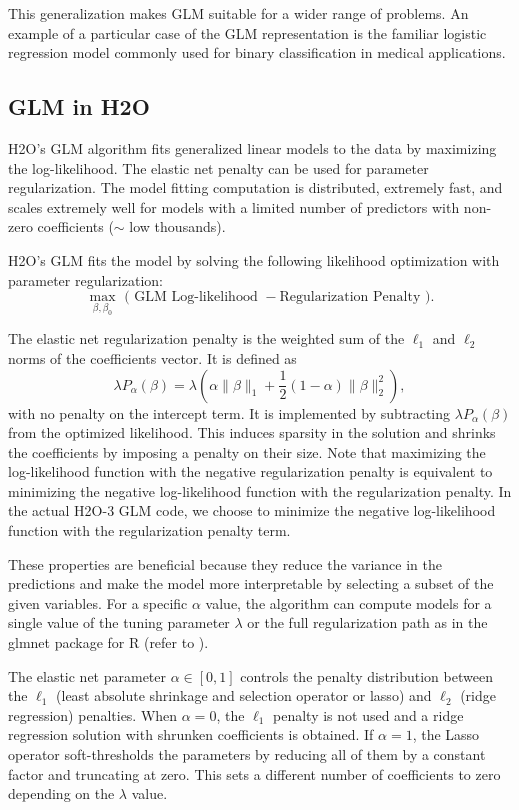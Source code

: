 This generalization makes GLM suitable for a wider range of problems. An example of a particular case of the GLM representation is the familiar logistic regression model commonly used for binary classification in medical applications. 


\subsection{GLM in H2O}
H2O's GLM algorithm fits generalized linear models to the data by maximizing the log-likelihood. The elastic net penalty can be used for parameter regularization. The model fitting computation is distributed, extremely fast, and scales extremely well for models with a limited number of predictors with non-zero coefficients ($\mathtt{\sim}$ low thousands).  

H2O's GLM fits the model by solving the following likelihood optimization with parameter regularization:
 $$\max_{\beta,\beta_0} \mbox{  ( GLM Log-likelihood }  - \mbox{Regularization Penalty )} .$$

The elastic net regularization penalty is the weighted sum of the $\ell_1$ and $\ell_2$ norms of the coefficients vector. It is defined as $$\lambda P_{\alpha}(\beta) = \lambda \left(\alpha \| \beta \|_1 + \frac{1}{2} (1- \alpha) \| \beta \|_2^2 \right),$$ with no penalty on the intercept term. It is implemented by subtracting $\lambda P_{\alpha}(\beta)$ from the optimized likelihood. This induces sparsity in the solution and shrinks the coefficients by imposing a penalty on their size. Note that maximizing the log-likelihood function with the negative regularization penalty is equivalent to minimizing the negative log-likelihood function with the regularization penalty. In the actual H2O-3 GLM code, we choose to minimize the negative log-likelihood function with the regularization penalty term.

These properties are beneficial because they reduce the variance in the predictions and make the model more interpretable by selecting a subset of the given variables. For a specific $\alpha$ value, the algorithm can compute models for a single value of the tuning parameter $\lambda$ or the full regularization path as in the glmnet package for R (refer to ).

The elastic net parameter $\alpha \in [0,1]$ controls the penalty distribution between the $\ell_1$ (least absolute shrinkage and selection operator or lasso) and $\ell_2$ (ridge regression)
penalties. When $\alpha=0$, the $\ell_1$ penalty is not used and a
ridge regression solution with shrunken coefficients is obtained. If $\alpha=1$, the Lasso operator soft-thresholds the parameters by reducing all of them by a constant factor and truncating at zero. This sets a different number of coefficients to zero depending on the $\lambda$ value.
 
